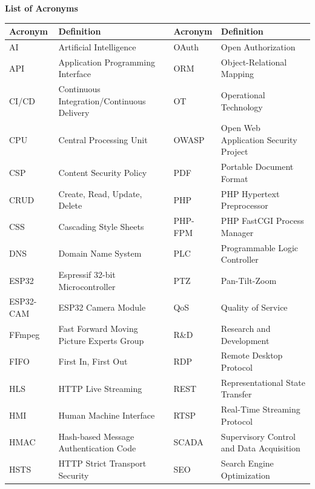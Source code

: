 \thispagestyle{plain}
{\huge\bfseries List of Acronyms}
\vspace{1cm}
{\footnotesize
\begin{longtable}{@{}p{2cm}p{5.5cm}|p{2cm}p{5.5cm}@{}}
\textbf{Acronym} & \textbf{Definition} & \textbf{Acronym} & \textbf{Definition} \\ \hline
AI       & Artificial Intelligence                          & OAuth    & Open Authorization \\
API      & Application Programming Interface               & ORM      & Object-Relational Mapping \\
CI/CD    & Continuous Integration/Continuous Delivery       & OT       & Operational Technology \\
CPU      & Central Processing Unit                         & OWASP    & Open Web Application Security Project \\
CSP      & Content Security Policy                         & PDF      & Portable Document Format \\
CRUD     & Create, Read, Update, Delete                    & PHP      & PHP Hypertext Preprocessor \\
CSS      & Cascading Style Sheets                          & PHP-FPM  & PHP FastCGI Process Manager \\
DNS      & Domain Name System                              & PLC      & Programmable Logic Controller \\
ESP32    & Espressif 32-bit Microcontroller                & PTZ      & Pan-Tilt-Zoom \\
ESP32-CAM & ESP32 Camera Module                            & QoS      & Quality of Service \\
FFmpeg   & Fast Forward Moving Picture Experts Group       & R\&D     & Research and Development \\
FIFO     & First In, First Out                             & RDP      & Remote Desktop Protocol \\
HLS      & HTTP Live Streaming                             & REST     & Representational State Transfer \\
HMI      & Human Machine Interface                         & RTSP     & Real-Time Streaming Protocol \\
HMAC     & Hash-based Message Authentication Code          & SCADA    & Supervisory Control and Data Acquisition \\
HSTS     & HTTP Strict Transport Security                  & SEO      & Search Engine Optimization \\

\end{longtable}}
